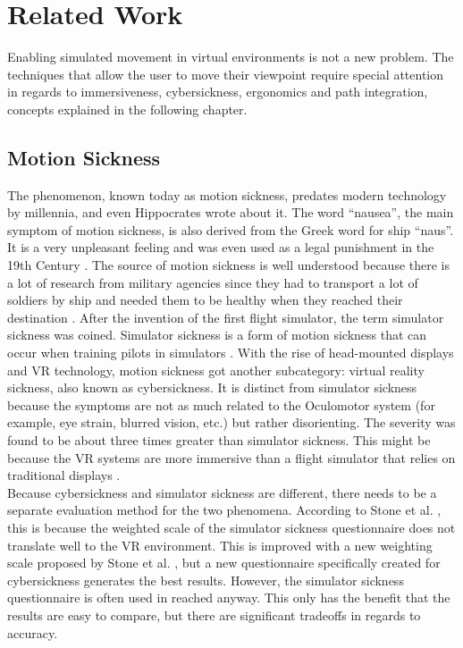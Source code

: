 \chapter{Related Work}
Enabling simulated movement in virtual environments is not a new problem. 
The techniques that allow the user to move their viewpoint require special attention in regards to immersiveness, cybersickness, ergonomics and path integration, concepts explained in the following chapter.

\section{Motion Sickness}\label{motion-sickness}

The phenomenon, known today as motion sickness, predates modern technology
by millennia, and even Hippocrates wrote about it. The word ``nausea'',
the main symptom of motion sickness, is also derived from the Greek word
for ship ``naus''. \cite{Golding} It is a very
unpleasant feeling and was even used as a legal punishment in the 19th
Century \cite{Reason}. The source of motion sickness is
well understood because there is a lot of research from military agencies
since they had to transport a lot of soldiers by ship and needed them to
be healthy when they reached their destination
\cite{Johnson}. After the invention of the first flight
simulator, the term simulator sickness was coined. Simulator sickness is
a form of motion sickness that can occur when training pilots in
simulators \cite{Johnson}. With the rise of head-mounted
displays and VR technology, motion sickness got another subcategory:
virtual reality sickness, also known as cybersickness. It is distinct
from simulator sickness because the symptoms are not as much related to
the Oculomotor system (for example, eye strain, blurred vision, etc.) but
rather disorienting. The severity was found to be about three times greater
than simulator sickness. This might be because the VR systems are more
immersive than a flight simulator that relies on traditional displays
\cite{Stanney}.\\Because cybersickness and simulator
sickness are different, there needs to be a separate evaluation method
for the two phenomena. According to Stone et al. \cite{Stone}, this is because the
weighted scale of the simulator sickness questionnaire does not
translate well to the VR environment. This is improved with a new
weighting scale proposed by Stone et al. \cite{Stone}, but a new questionnaire
specifically created for cybersickness generates the best results.
However, the simulator sickness questionnaire is often used in reached
anyway. This only has the benefit that the results are easy to compare, but there are significant tradeoffs in regards to accuracy.

